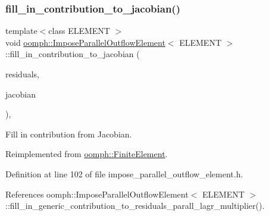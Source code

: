 \subsubsection{\texorpdfstring{fill\+\_\+in\+\_\+contribution\+\_\+to\+\_\+jacobian()}{fill\_in\_contribution\_to\_jacobian()}}
{\footnotesize\ttfamily template$<$class E\+L\+E\+M\+E\+NT $>$ \\
void \hyperlink{classoomph_1_1ImposeParallelOutflowElement}{oomph\+::\+Impose\+Parallel\+Outflow\+Element}$<$ E\+L\+E\+M\+E\+NT $>$\+::fill\+\_\+in\+\_\+contribution\+\_\+to\+\_\+jacobian (\begin{DoxyParamCaption}\item[{\hyperlink{classoomph_1_1Vector}{Vector}$<$ double $>$ \&}]{residuals,  }\item[{\hyperlink{classoomph_1_1DenseMatrix}{Dense\+Matrix}$<$ double $>$ \&}]{jacobian }\end{DoxyParamCaption})\hspace{0.3cm}{\ttfamily [inline]}, {\ttfamily [virtual]}}



Fill in contribution from Jacobian. 



Reimplemented from \hyperlink{classoomph_1_1FiniteElement_a0ae7af222af38a0d53bf283dc85bdfea}{oomph\+::\+Finite\+Element}.



Definition at line 102 of file impose\+\_\+parallel\+\_\+outflow\+\_\+element.\+h.



References oomph\+::\+Impose\+Parallel\+Outflow\+Element$<$ E\+L\+E\+M\+E\+N\+T $>$\+::fill\+\_\+in\+\_\+generic\+\_\+contribution\+\_\+to\+\_\+residuals\+\_\+parall\+\_\+lagr\+\_\+multiplier().

\mbox{\label{classoomph_1_1ImposeParallelOutflowElement_a843675c8f7cb2f457df56fe69dd84517}} 
